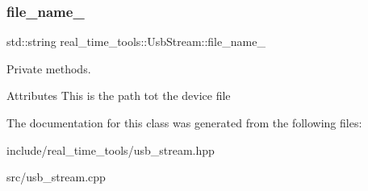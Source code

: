 \subsubsection{\texorpdfstring{file\+\_\+name\+\_\+}{file\_name\_}}
{\footnotesize\ttfamily std\+::string real\+\_\+time\+\_\+tools\+::\+Usb\+Stream\+::file\+\_\+name\+\_\+\hspace{0.3cm}{\ttfamily [private]}}



Private methods. 

Attributes This is the path tot the device file 

The documentation for this class was generated from the following files\+:\begin{DoxyCompactItemize}
\item 
include/real\+\_\+time\+\_\+tools/usb\+\_\+stream.\+hpp\item 
src/usb\+\_\+stream.\+cpp\end{DoxyCompactItemize}
